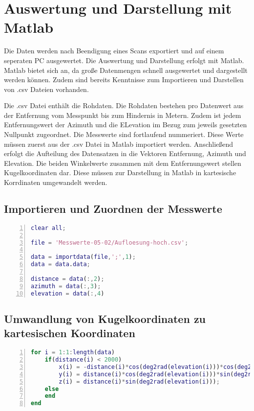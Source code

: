 

\chapter{Auswertung und Darstellung mit Matlab}

Die Daten werden nach Beendigung eines Scans exportiert und auf einem seperaten PC ausgewertet. Die Auswertung und Darstellung erfolgt mit Matlab. Matlab bietet sich an, da große Datenmengen schnell ausgewertet und dargestellt werden können. Zudem sind bereits Kenntnisse zum Importieren und Darstellen von .csv Dateien vorhanden. 

Die .csv Datei enthält die Rohdaten. Die Rohdaten bestehen pro Datenwert aus der Entfernung vom Messpunkt bis zum Hindernis in Metern. Zudem ist jedem Entfernungswert der Azimuth und die ELevation im Bezug zum jeweils gesetzten Nullpunkt zugeordnet. Die Messwerte sind fortlaufend nummeriert. 
Diese Werte müssen zuerst aus der .csv Datei in Matlab importiert werden. Anschließend erfolgt die Aufteilung des Datensatzen in die Vektoren Entfernung, Azimuth und Elevation.
Die beiden Winkelwerte zusammen mit dem Entfernungswert stellen Kugelkoordinaten dar. Diese müssen zur Darstellung in Matlab in kartesische Korrdinaten umgewandelt werden. 



\section{Importieren und Zuordnen der Messwerte}

\begin{lstlisting}[caption={Importieren und Zuordnen von .csv Dateien},language={Matlab}, label={import_data}, numbers=left]
% Anwendung zur Darstellung einer 3D Punktewolke aus einem LIDAR System
clear all;

file = 'Messwerte-05-02/Aufloesung-hoch.csv';

data = importdata(file,';',1); 
data = data.data;

distance = data(:,2);
azimuth = data(:,3);
elevation = data(:,4)
\end{lstlisting}


\section{Umwandlung von Kugelkoordinaten zu kartesischen Koordinaten}

\begin{lstlisting}[caption={Umwandlung von Kugelkoordinaten zu kartesischen Koordinaten},language={Matlab}, label={import_data}, numbers=left]
for i = 1:1:length(data)
	if(distance(i) < 2000)
		x(i) = -distance(i)*cos(deg2rad(elevation(i)))*cos(deg2rad(azimuth(i)));
		y(i) = distance(i)*cos(deg2rad(elevation(i)))*sin(deg2rad(azimuth(i)));
		z(i) = distance(i)*sin(deg2rad(elevation(i)));
	else
	end
end
\end{lstlisting}


